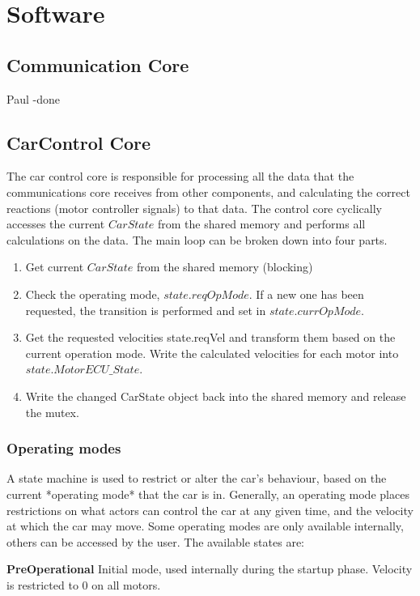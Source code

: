 \chapter{Software}

\section{Communication Core}
Paul -done

\section{CarControl Core}
The car control core is responsible for processing all the data that the communications core receives from other components, and calculating the correct reactions (motor controller signals) to that data. The control core cyclically accesses the current $CarState$ from the shared memory and performs all calculations on the data. The main loop can be broken down into four parts.

\begin{enumerate}
\item Get current $CarState$ from the shared memory (blocking)
\item Check the operating mode, $state.reqOpMode$. If a new one has been requested, the transition is performed and set in $state.currOpMode$.
\item Get the requested velocities state.reqVel and transform them based on the current operation mode. Write the calculated velocities for each motor into $state.MotorECU\_State$.
\item Write the changed CarState object back into the shared memory and release the mutex.
\end{enumerate}

\subsection{Operating modes}
A state machine is used to restrict or alter the car's behaviour, based on the current *operating mode* that the car is in. Generally, an operating mode places restrictions on what actors can control the car at any given time, and the velocity at which the car may move. Some operating modes are only available internally, others can be accessed by the user. The available states are:

\textbf{PreOperational} Initial mode, used internally during the startup phase. Velocity is restricted to 0 on all motors.

